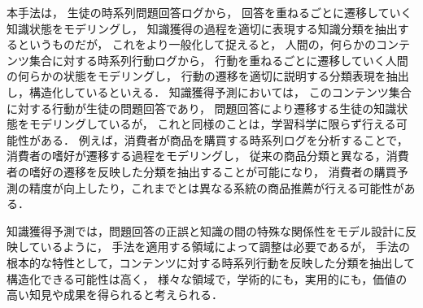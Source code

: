 本手法は，
生徒の時系列問題回答ログから，
回答を重ねるごとに遷移していく知識状態をモデリングし，
知識獲得の過程を適切に表現する知識分類を抽出するというものだが，
これをより一般化して捉えると，
人間の，何らかのコンテンツ集合に対する時系列行動ログから，
行動を重ねるごとに遷移していく人間の何らかの状態をモデリングし，
行動の遷移を適切に説明する分類表現を抽出し，構造化しているといえる．
知識獲得予測においては，
このコンテンツ集合に対する行動が生徒の問題回答であり，
問題回答により遷移する生徒の知識状態をモデリングしているが，
これと同様のことは，学習科学に限らず行える可能性がある．
例えば，消費者が商品を購買する時系列ログを分析することで，
消費者の嗜好が遷移する過程をモデリングし，
従来の商品分類と異なる，消費者の嗜好の遷移を反映した分類を抽出することが可能になり，
消費者の購買予測の精度が向上したり，これまでとは異なる系統の商品推薦が行える可能性がある．

知識獲得予測では，問題回答の正誤と知識の間の特殊な関係性をモデル設計に反映しているように，
手法を適用する領域によって調整は必要であるが，
手法の根本的な特性として，コンテンツに対する時系列行動を反映した分類を抽出して構造化できる可能性は高く，
様々な領域で，学術的にも，実用的にも，価値の高い知見や成果を得られると考えられる．

